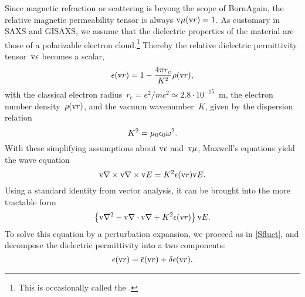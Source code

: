 Since magnetic refraction or scattering is beyong the scope of BornAgain,
the relative magnetic permeability tensor is always $\text{v}{\mu}(\text{v}{r})=1$.
%
%
As customary in SAXS and GISAXS,
%
%
we assume
that the dielectric properties of the material are those of a polarizable electron cloud.\footnote
{This is occasionally called the 
%
 \cite{Lau31}.}
Thereby the relative dielectric permittivity tensor~$\text{v}{\epsilon}$
%
%
becomes a scalar,
\begin{equation}
  \epsilon(\text{v}{r})=1-\frac{4\pi r_e}{K^2}\rho(\text{v}{r}),
\end{equation}
%
%
with the classical electron radius~$r_e=e^2/mc^2\simeq2.8\cdot10^{-15}$~m,
%
%
%
the electron number density~$\rho(\text{v}{r})$,
%
%
%
and the vacuum wavenumber~$K$,
given by the dispersion relation
\begin{equation}
  K^2 = \mu_0\epsilon_0\omega^2.
\end{equation}
%
With these simplifying assumptions about $\text{v}{\epsilon}$ and~$\text{v}{\mu}$,
Maxwell's equations yield the wave equation
\begin{equation}\label{ENabCrossNabE}
  \text{v}{\nabla}\times\text{v}{\nabla}\times\text{v}{E} = K^2\epsilon(\text{v}{r})\text{v}{E}.
\end{equation}
%
%
Using a standard identity from vector analysis, it can be brought into the more tractable form
\begin{equation}\label{ENabNabE}
  \left\{\text{v}{\nabla}^2-\text{v}{\nabla}\cdot\text{v}{\nabla}+ K^2\epsilon(\text{v}{r})\right\}\text{v}{E}.
\end{equation}
To solve this equation by a perturbation expansion,
%
we proceed as in \cref{Sfluct},
and decompose the dielectric permittivity
into a two components:
\begin{equation}
  \epsilon(\text{v}{r}) = \overline{\epsilon}(\text{v}{r}) + \delta\epsilon(\text{v}{r}).
\end{equation}
%
